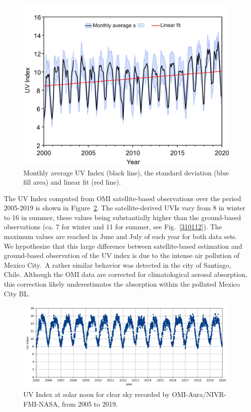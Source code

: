 \documentclass[journal=jacsat,manuscript=article]{achemso}
\begin{document}
\begin{figure}[H]
  \begin{center}
    \includegraphics[width=0.70\columnwidth]{figures/UV_Moving_Average}
    \caption{{Monthly
          average UV Index (black line), the standard deviation (blue fill area) and linear fit (red line).
            {\label{185758}}%
        }}
  \end{center}
\end{figure}

The UV Index computed from OMI satellite-based observations
over the period 2005-2019 is shown in
Figure~{\ref{485116}}. The satellite-derived UVIs vary
from 8 in winter to 16 in summer, these values being substantially higher
than the ground-based observations (ca. 7 for winter and 11 for summer,
see Fig.~{\ref{310112}}). The maximum values are reached in June and July of each year for both data sets.
We hypothesize that this large difference between satellite-based estimation and ground-based
observation of the UV index is due to the intense air pollution of
Mexico City.~A rather similar behavior was detected in the city of Santiago,
Chile.\citep{Cabrera_2012} Although the OMI data are corrected for climatological aerosol absorption\citep{Arola_2009}, this correction likely underestimates the absorption within the polluted Mexico City BL.


\begin{figure}[H]
  \begin{center}
    \includegraphics[width=0.70\columnwidth]{figures/CSUVindex}
    \caption{{UV Index at solar noon for clear sky recorded by OMI-Aura/NIVR-FMI-NASA,
          from 2005 to 2019.
            {\label{485116}}%
        }}
  \end{center}
\end{figure}
\end{document}
